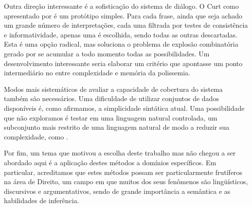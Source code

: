   Outra direção interessante é a sofisticação do sistema de diálogo. O Curt como apresentado por \citet{BlackburnBos:2005} é um protótipo simples. Para cada frase, ainda que seja achado um grande número de interpretações, cada uma filtrada por testes de consistência e informatividade, apenas uma é escolhida, sendo todas as outras descartadas. Esta é uma opção radical, mas soluciona o problema de explosão combinatória gerado por se acumular a todo momento todas as possibilidades. Um desenvolvimento interessante seria elaborar um critério que apontasse um ponto intermediário no  entre complexidade e memória da polissemia. %
  
  Modos mais sistemáticos de avaliar a capacidade de cobertura do sistema também são necessários. Uma dificuldade de utilizar conjuntos de dados disponíveis é, como afirmamos, a simplicidade sintática atual. Uma possibilidade que não exploramos é testar em uma linguagem natural controlada, um subconjunto mais restrito de uma linguagem natural de modo a reduzir sua complexidade, como . \citep{fuchs:reasoningweb2008}
  
  Por fim, um tema que motivou a escolha deste trabalho mas não chegou a ser abordado aqui é a aplicação destes métodos a domínios específicos. Em particular, acreditamos que estes métodos possam ser particularmente frutíferos na área de Direito, um campo em que muitos dos seus fenômenos são lingüísticos, discursivos e argumentativos, sendo de grande importância a semântica e as habilidades de inferência.
